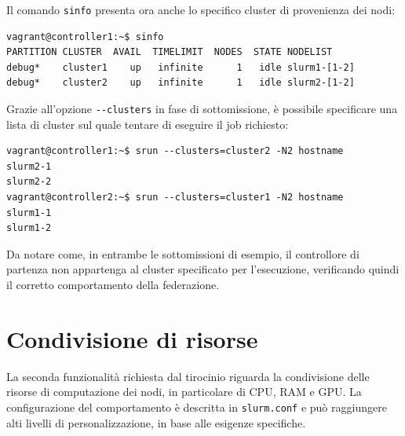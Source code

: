 \documentclass[12pt,a4paper,twoside,openright]{book}
\begin{document}
Il comando \texttt{sinfo} presenta ora anche lo specifico cluster di provenienza dei nodi:
\begin{verbatim}
vagrant@controller1:~$ sinfo
PARTITION CLUSTER  AVAIL  TIMELIMIT  NODES  STATE NODELIST
debug*    cluster1    up   infinite      1   idle slurm1-[1-2]
debug*    cluster2    up   infinite      1   idle slurm2-[1-2]
\end{verbatim}
Grazie all'opzione \texttt{{-}{-}clusters} in fase di sottomissione, è possibile specificare una lista di cluster sul quale tentare di eseguire il job richiesto:
\begin{verbatim}
vagrant@controller1:~$ srun --clusters=cluster2 -N2 hostname
slurm2-1
slurm2-2
vagrant@controller2:~$ srun --clusters=cluster1 -N2 hostname
slurm1-1
slurm1-2
\end{verbatim}
Da notare come, in entrambe le sottomissioni di esempio, il controllore di partenza non appartenga al cluster specificato per l'esecuzione, verificando quindi il corretto comportamento della federazione.

\section{Condivisione di risorse}
La seconda funzionalità richiesta dal tirocinio riguarda la condivisione delle risorse di computazione dei nodi, in particolare di \ac{CPU}, \ac{RAM} e \ac{GPU}. La configurazione del comportamento è descritta in \texttt{slurm.conf} e può raggiungere alti livelli di personalizzazione, in base alle esigenze specifiche.
\end{document}
